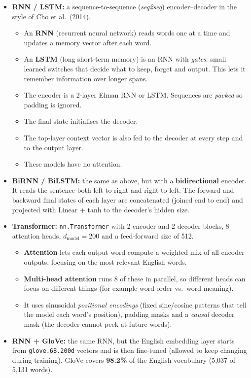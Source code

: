 \documentclass[11pt,a4paper]{article}
\newcommand{\term}[1]{\textbf{\textcolor{cModel}{#1}}}
\begin{document}
\begin{itemize}
\item \textbf{RNN / LSTM:} a sequence-to-sequence (\emph{seq2seq}) encoder--decoder in the style of Cho et al.\ (2014).
  \begin{itemize}
  \item An \term{RNN} (recurrent neural network) reads words one at a time and updates a memory vector after each word.
  \item An \term{LSTM} (long short-term memory) is an RNN with \emph{gates}: small learned switches that decide what to keep, forget and output. This lets it remember information over longer spans.
  \item The encoder is a 2-layer Elman RNN or LSTM. Sequences are \emph{packed} so padding is ignored.
  \item The final state initialises the decoder.
  \item The top-layer context vector is also fed to the decoder at every step and to the output layer.
  \item These models have no attention.
  \end{itemize}
\item \textbf{BiRNN / BiLSTM:} the same as above, but with a \term{bidirectional} encoder. It reads the sentence both left-to-right and right-to-left.
  The forward and backward final states of each layer are concatenated (joined end to end) and projected with Linear + tanh to the decoder's hidden size.
\item \textbf{Transformer:} \texttt{nn.Transformer} with 2 encoder and 2 decoder blocks, 8 attention heads, $d_\text{model} = 200$ and a feed-forward size of 512.
  \begin{itemize}
  \item \term{Attention} lets each output word compute a weighted mix of all encoder outputs, focusing on the most relevant English words.
  \item \term{Multi-head attention} runs 8 of these in parallel, so different heads can focus on different things (for example word order vs.\ word meaning).
  \item It uses sinusoidal \emph{positional encodings} (fixed sine/cosine patterns that tell the model each word's position), padding masks and a \emph{causal} decoder mask (the decoder cannot peek at future words).
  \end{itemize}
\item \textbf{RNN + GloVe:} the same RNN, but the English embedding layer starts from \texttt{glove.6B.200d} vectors and is then fine-tuned (allowed to keep changing during training).
  GloVe covers \textbf{98.2\%} of the English vocabulary (5,037 of 5,131 words).
\end{itemize}
\end{document}
